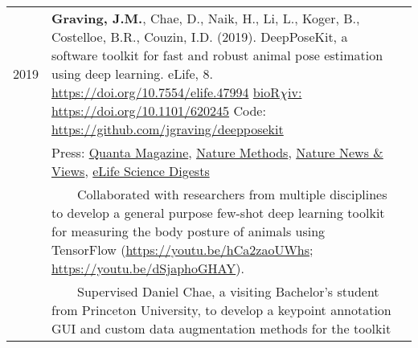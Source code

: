 \documentclass[letterpaper,10pt,oneside]{article}
\newcommand{\tabitem}{~~\hspace{5mm}\llap{ \textbullet}~~}
\begin{document}
\begin{small}
\begin{longtable}{@{} l p{5.3in}l}
\large{2019}
 &\textbf{Graving, J.M.}, Chae, D., Naik, H., Li, L., Koger, B., Costelloe, B.R., Couzin, I.D. (2019). DeepPoseKit, a software toolkit for fast and robust animal pose estimation using deep learning. eLife, 8. \href{https://doi.org/10.7554/elife.47994}{https://doi.org/10.7554/elife.47994}  \href{https://doi.org/10.1101/620245}{bioR$\chi$iv: https://doi.org/10.1101/620245} Code: \href{https://github.com/jgraving/deepposekit}{ https://github.com/jgraving/deepposekit} \\
 &Press: \href{https://www.quantamagazine.org/to-decode-the-brain-scientists-automate-the-study-of-behavior-20191210/}{Quanta Magazine}, 
 \href{https://doi.org/10.1038/s41592-019-0678-2}{Nature Methods},
 \href{https://doi.org/10.1038/d41586-019-02942-5}{Nature News \& Views},
 \href{https://elifesciences.org/digests/47994/machine-learning-animal-poses-to-understand-behavior}{eLife Science Digests}
 \vspace{2mm} \\
 & 	\tabitem Collaborated with researchers from multiple disciplines to develop a general purpose few-shot deep learning toolkit for measuring the body posture of animals using TensorFlow (\href{https://youtu.be/hCa2zaoUWhs}{https://youtu.be/hCa2zaoUWhs}; \href{https://youtu.be/dSjaphoGHAY}{https://youtu.be/dSjaphoGHAY}).  \\
  & 	\tabitem Supervised Daniel Chae, a visiting Bachelor's student from Princeton University, to develop a keypoint annotation GUI and custom data augmentation methods for the toolkit\\


\end{longtable}
\end{small}
\end{document}
